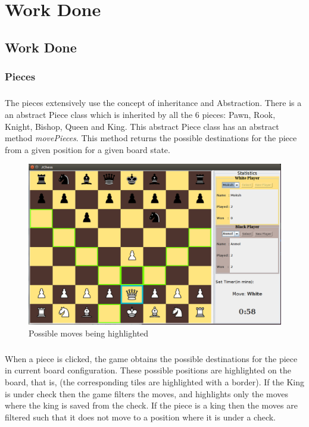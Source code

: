 \chapter{Work Done}

\section{Work Done}

\subsection{Pieces}
\paragraph{}
The pieces extensively use the concept of inheritance and Abstraction. There is a an abstract Piece class which is inherited by all the 6 pieces: Pawn, Rook, Knight, Bishop, Queen and King. This abstract Piece class has an abstract method \textit{movePieces}. This method returns the possible destinations for the piece from a given position for a given board state.

\begin{figure}[htb]
\centering
\includegraphics[scale=0.3]{SS-PossibleMoves.png} %
\caption{Possible moves being highlighted}
\label{fig:label} %
\end{figure}

\paragraph{}
When a piece is clicked, the game obtains the possible destinations for the piece in current board configuration. These possible positions are highlighted on the board, that is, (the corresponding tiles are highlighted with a border). If the King is under check then the game filters the moves, and highlights only the moves where the king is saved from the check. If the piece is a king then the moves are filtered such that it does not move to a position where it is under a check.


